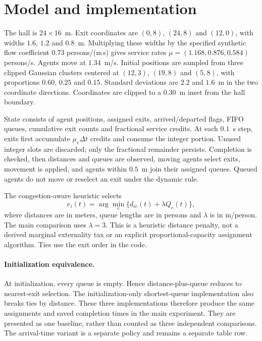 \documentclass[10pt]{article}
\begin{document}
\section{Model and implementation}
The hall is $24\times16$~m. Exit coordinates are $(0,8)$, $(24,8)$ and $(12,0)$, with widths $1.6$, $1.2$ and $0.8$~m. Multiplying these widths by the specified synthetic flow coefficient $0.73$ persons/(m\,s) gives service rates $\mu=(1.168,0.876,0.584)$ persons/s. Agents move at $1.34$~m/s. Initial positions are sampled from three clipped Gaussian clusters centered at $(12,3)$, $(19,8)$ and $(5,8)$, with proportions $0.60$, $0.25$ and $0.15$. Standard deviations are $2.2$ and $1.6$~m in the two coordinate directions. Coordinates are clipped to a 0.30~m inset from the hall boundary.

State consists of agent positions, assigned exits, arrived/departed flags, FIFO queues, cumulative exit counts and fractional service credits. At each $0.1$~s step, exits first accumulate $\mu_e\Delta t$ credits and consume the integer portion. Unused integer slots are discarded; only the fractional remainder persists. Completion is checked, then distances and queues are observed, moving agents select exits, movement is applied, and agents within $0.5$~m join their assigned queues. Queued agents do not move or reselect an exit under the dynamic rule.

The congestion-aware heuristic selects
\[
e_i(t)=\arg\min_e\{d_{ie}(t)+\lambda Q_e(t)\},
\]
where distances are in meters, queue lengths are in persons and $\lambda$ is in m/person. The main comparison uses $\lambda=3$. This is a heuristic distance penalty, not a derived marginal externality tax or an explicit proportional-capacity assignment algorithm. Ties use the exit order in the code.

\paragraph{Initialization equivalence.}
At initialization, every queue is empty. Hence distance-plus-queue reduces to nearest-exit selection. The initialization-only shortest-queue implementation also breaks ties by distance. These three implementations therefore produce the same assignments and saved completion times in the main experiment. They are presented as one baseline, rather than counted as three independent comparisons. The arrival-time variant is a separate policy and remains a separate table row.
\end{document}
